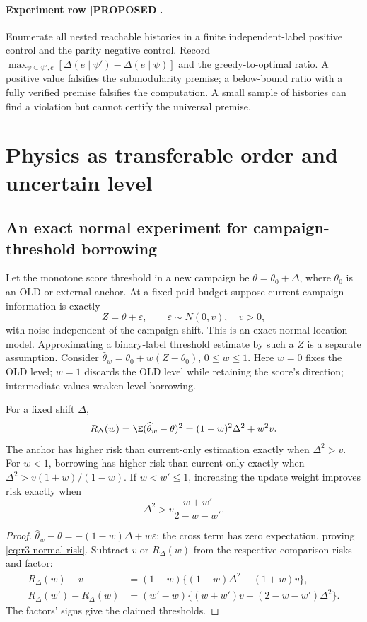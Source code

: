 \paragraph{Experiment row [PROPOSED].}
Enumerate all nested reachable histories in a finite independent-label
positive control and the parity negative control.  Record
$\max_{\psi\subseteq\psi',e}[\Delta(e\mid\psi')-\Delta(e\mid\psi)]$
and the greedy-to-optimal ratio.  A positive value falsifies the
submodularity premise; a below-bound ratio with a fully verified premise
falsifies the computation.  A small sample of histories can find a
violation but cannot certify the universal premise.

\section{Physics as transferable order and uncertain level}

\subsection{An exact normal experiment for campaign-threshold borrowing}

Let the monotone score threshold in a new campaign be
$\theta=\theta_0+\Delta$, where $\theta_0$ is an OLD or external anchor.
At a fixed paid budget suppose current-campaign information is exactly
\[
 Z=\theta+\varepsilon,\qquad \varepsilon\sim N(0,v),\quad v>0,
\]
with noise independent of the campaign shift.  This is an exact
normal-location model.  Approximating a binary-label threshold estimate
by such a $Z$ is a separate assumption.  Consider
$\widehat\theta_w=\theta_0+w(Z-\theta_0)$, $0\leq w\leq1$.
Here $w=0$ fixes the OLD level; $w=1$ discards the OLD level while retaining
the score's direction; intermediate values weaken level borrowing.

\begin{proposition}
For a fixed shift $\Delta$,
\begin{equation}
 R_\Delta(w)=\E(\widehat\theta_w-\theta)^2
           =(1-w)^2\Delta^2+w^2v.
 \label{eq:r3-normal-risk}
\end{equation}
The anchor has higher risk than current-only estimation exactly when
$\Delta^2>v$.  For $w<1$, borrowing has higher risk than current-only
exactly when $\Delta^2>v(1+w)/(1-w)$.  If $w<w'\leq1$, increasing the
update weight improves risk exactly when
\[
 \Delta^2>v\frac{w+w'}{2-w-w'}.
\]
\end{proposition}
\begin{proof}
$\widehat\theta_w-\theta=-(1-w)\Delta+w\varepsilon$; the cross term has
zero expectation, proving \eqref{eq:r3-normal-risk}.  Subtract $v$ or
$R_\Delta(w)$ from the respective comparison risks and factor:
\begin{align*}
 R_\Delta(w)-v
 &=(1-w)\{(1-w)\Delta^2-(1+w)v\},\\
 R_\Delta(w')-R_\Delta(w)
 &=(w'-w)\{(w+w')v-(2-w-w')\Delta^2\}.
\end{align*}
The factors' signs give the claimed thresholds.
\end{proof}


